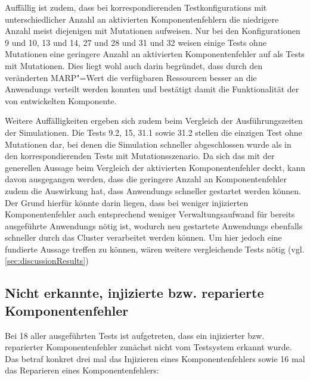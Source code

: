 Auffällig ist zudem, dass bei korrespondierenden \glspl{Testkonfiguration} mit unterschiedlicher Anzahl an aktivierten Komponentenfehlern die niedrigere Anzahl meist diejenigen mit Mutationen aufweisen.
Nur bei den Konfigurationen 9 und 10, 13 und 14, 27 und 28 und 31 und 32 weisen einige \glspl{Test} ohne Mutationen eine geringere Anzahl an aktivierten Komponentenfehler auf als \glspl{Test} mit Mutationen.
Dies liegt wohl auch darin begründet, dass durch den veränderten \gls{MARP}"=Wert die verfügbaren Ressourcen besser an die \glspl{Anwendung} verteilt werden konnten und bestätigt damit die Funktionalität der von \citeauthor{Zhang2016} entwickelten Komponente.

Weitere Auffälligkeiten ergeben sich zudem beim Vergleich der Ausführungszeiten der Simulationen.
Die \glspl{Test} 9.2, 15, 31.1 sowie 31.2 stellen die einzigen \gls{Test} ohne Mutationen dar, bei denen die Simulation schneller abgeschlossen wurde als in den korrespondierenden \glspl{Test} mit Mutationsszenario.
Da sich das mit der generellen Aussage beim Vergleich der aktivierten Komponentenfehler deckt, kann davon ausgegangen werden, dass die geringere Anzahl an Komponentenfehler zudem die Auswirkung hat, dass \glspl{Anwendung} schneller gestartet werden können.
Der Grund hierfür könnte darin liegen, dass bei weniger injizierten Komponentenfehler auch entsprechend weniger Verwaltungsaufwand für bereits ausgeführte \glspl{Anwendung} nötig ist, wodurch neu gestartete \glspl{Anwendung} ebenfalls schneller durch das Cluster verarbeitet werden können.
Um hier jedoch eine fundierte Aussage treffen zu können, wären weitere vergleichende \glspl{Test} nötig (vgl. \cref{sec:discussionResults})

\subsection{Nicht erkannte, injizierte bzw. reparierte Komponentenfehler}
\label{subsec:notDetectedFaults}

Bei 18 aller ausgeführten \glspl{Test} ist aufgetreten, dass ein injizierter bzw. reparierter Komponentenfehler zunächst nicht vom Testsystem erkannt wurde.
Das betraf konkret drei mal das Injizieren eines Komponentenfehlers sowie 16 mal das Reparieren eines Komponentenfehlers:


